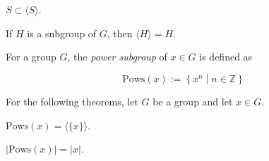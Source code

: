 \begin{theorem}
    \label{theorem : Generate_contain_set}
    \leanok
    $S \subset \langle S \rangle$.
\end{theorem}

\begin{theorem}
    \label{theorem : Generate_self_eq_self}
    \leanok
    If $H$ is a subgroup of $G$, then $\langle H \rangle = H$.
\end{theorem}

\begin{definition}
    \label{definition : Pows}
    \leanok
    For a group $G$, the \textit{power subgroup} of $x \in G$ is defined as

    $$\text{Pows}(x) := \left\{ x^n \middle| n \in \mathbb{Z} \right\}$$
\end{definition}

For the following theorems, let $G$ be a group and let $x \in G$.

\begin{theorem}
    \label{theorem : Pows_eq_Generate_singleton}
    \leanok
    $\text{Pows}(x) = \langle \{x\} \rangle$.
\end{theorem}

\begin{theorem}
    \label{theorem : Pows_card_eq_order}
    \leanok
    $|\text{Pows}(x)| = |x|$.
\end{theorem}
